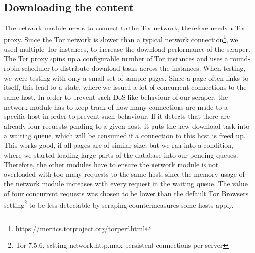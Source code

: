 \documentclass[USenglish,oneside,twocolumn]{article}
\begin{document}
\subsection{Downloading the content}
The network module needs to connect to the Tor network, therefore needs a Tor proxy. Since the Tor network is slower than a typical network connection\footnote{\href{https://metrics.torproject.org/torperf.html?source=all&server=onion&filesize=50kb}{https://metrics.torproject.org/torperf.html}}, we used multiple Tor instances, to increase the download performance of the scraper. The Tor proxy spins up a configurable number of Tor instances and uses a round-robin scheduler to distribute download tasks across the instances.
When testing, we were testing with only a small set of sample pages. Since a page often links to itself, this lead to a state, where we issued a lot of concurrent connections to the same host. In order to prevent such DoS like behaviour of our scraper, the network module has to keep track of how many connections are made to a specific host in order to prevent such behaviour. If it detects that there are already four requests pending to a given host, it puts the new download task into a waiting queue, which will be consumed if a connection to this host is freed up. This works good, if all pages are of similar size, but we ran into a condition, where we started loading large parts of the database into our pending queues. Therefore, the other modules have to ensure the network module is not overloaded with too many requests to the same host, since the memory usage of the network module increases with every request in the waiting queue. The value of four concurrent requests was chosen to be lower than the default Tor Browsers setting\footnote{Tor 7.5.6, setting network.http.max-persistent-connections-per-server} to be less detectable by scraping countermeasures some hosts apply.
\end{document}
